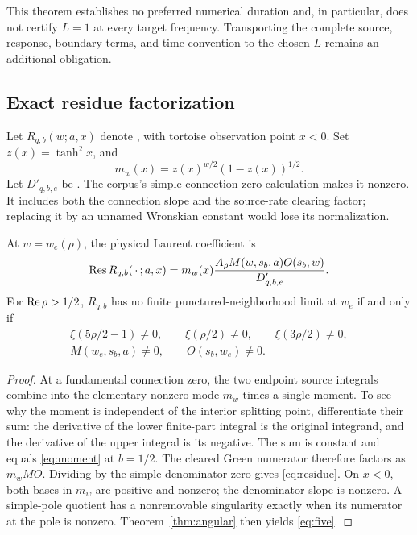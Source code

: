 This theorem establishes no preferred numerical duration and, in particular, does not certify \(L=1\) at every target frequency. Transporting the complete source, response, boundary terms, and time convention to the chosen \(L\) remains an additional obligation.

\subsection{Exact residue factorization}

Let \(R_{q,b}(w;a,x)\) denote , with tortoise observation point \(x<0\). Set \(z(x)=\tanh^2x\), and
\[
 m_w(x)=z(x)^{w/2}(1-z(x))^{1/2}.
\]
Let \(D'_{q,b,e}\) be . The corpus's simple-connection-zero calculation makes it nonzero. It includes both the connection slope and the source-rate clearing factor; replacing it by an unnamed Wronskian constant would lose its normalization.

\begin{theorem}\label{thm:survival}
At \(w=w_e(\rho)\), the physical Laurent coefficient is
\begin{equation}\label{eq:residue}
 \operatorname{Res} R_{q,b}(\,\cdot\,;a,x)
 =m_w(x)\frac{A_\rho M(w,s_b,a)O(s_b,w)}{D'_{q,b,e}}.
\end{equation}
For \(\operatorname{Re}\rho>1/2\), \(R_{q,b}\) has no finite punctured-neighborhood limit at \(w_e\) if and only if
\begin{equation}\label{eq:five}
 \begin{gathered}
 \xi(5\rho/2-1)\ne0,\qquad\xi(\rho/2)\ne0,\qquad\xi(3\rho/2)\ne0,\\
 M(w_e,s_b,a)\ne0,\qquad O(s_b,w_e)\ne0.
 \end{gathered}
\end{equation}
\end{theorem}
\begin{proof}
At a fundamental connection zero, the two endpoint source integrals combine into the elementary nonzero mode \(m_w\) times a single moment. To see why the moment is independent of the interior splitting point, differentiate their sum: the derivative of the lower finite-part integral is the original integrand, and the derivative of the upper integral is its negative. The sum is constant and equals \eqref{eq:moment} at \(b=1/2\). The cleared Green numerator therefore factors as \(m_wMO\). Dividing by the simple denominator zero gives \eqref{eq:residue}. On \(x<0\), both bases in \(m_w\) are positive and nonzero; the denominator slope is nonzero. A simple-pole quotient has a nonremovable singularity exactly when its numerator at the pole is nonzero. Theorem~\ref{thm:angular} then yields \eqref{eq:five}.
\end{proof}

